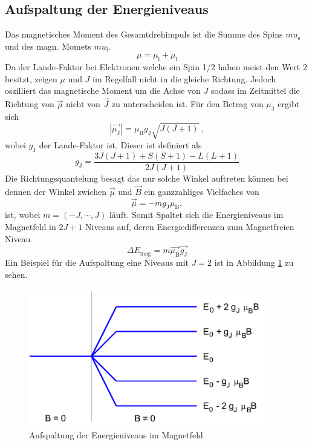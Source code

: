 \subsection{Aufspaltung der Energieniveaus}
Das magnetisches Moment des Gesamtdrehimpuls ist die Summe des Spins $mu_\text{s}$ und des magn. Momets $mu_\text{l}$.
\begin{equation}
  \mu = \mu_\text{l} + \mu_\text{l}
\end{equation}
Da der Lande-Faktor bei Elektronen welche ein Spin 1/2 haben meist den Wert 2 besitzt, zeigen $\mu$ und $J$ im Regelfall nicht in die gleiche Richtung. Jedoch oszilliert das magnetische Moment um die Achse von $J$ sodass im Zeitmittel die Richtung von $\vec{\mu}$ nicht von $\vec{J}$ zu unterscheiden ist. Für den Betrag von $\mu_\text{J}$ ergibt sich
\begin{equation}
  |\vec{\mu_\text{J}}| = \mu_\text{B} g_\text{J} \sqrt{J(J+1)} \ ,
  \label{eqn:muJ}
\end{equation}
wobei $g_\text{J}$ der Lande-Faktor ist. Dieser ist definiert als
\begin{equation}
  g_\text{J} = \frac{3J(J+1) + S(S+1) -L(L+1)}{2J(J+1)}
  \label{eqn:Lan}
\end{equation}
Die Richtungsquantelung besagt das nur solche Winkel auftreten können bei dennen der Winkel zwichen $\vec{\mu}$ und $\vec{B}$ ein ganzzahliges Vielfaches von
\begin{equation}
\vec{\mu} = -m g_\text{J} \mu_\text{B},
  \label{eqn:mu}
\end{equation}
ist, wobei  $m  = (-J, \cdots, J)$ läuft. Somit Spaltet sich die Energieniveaus im Magnetfeld in $2J+1$ Niveaus auf, deren Energiedifferenzen zum Magnetfreien Niveau
\begin{equation}
	\Delta E_\text{mag} = m \vec{\mu_\text{B}} \vec{g_\text{J}}
  \label{eqn:delE}
\end{equation}
Ein Beispiel für die Aufspaltung eine Niveaus mit $J=2$ ist in Abbildung \ref{fig:Eniv} zu sehen.
\begin{figure}
  \centering
  \includegraphics[height=6cm]{./Bilder/ENiveaus.png}
  \caption{Aufspaltung der Energieniveaus im Magnetfeld \cite{V27}}
   \label{fig:Eniv}
\end{figure}

